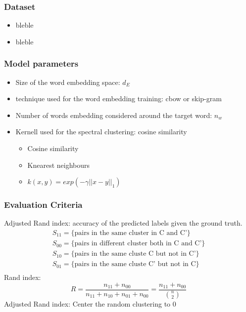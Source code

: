 \documentclass{beamer}
\begin{document}
 

\begin{frame}
\frametitle{Dataset}
\begin{itemize} 
\item bleble
\item bleble
\end{itemize}
\end{frame}

\begin{frame}
\frametitle{Model parameters}
\begin{itemize} 
\item Size of the word  embedding space: $d_E$
\item technique used for the word embedding training: cbow  or skip-gram
\item Number of words embedding considered around the target word: $n_w$
\item Kernell used for the spectral clustering: cosine similarity 
\begin{itemize}
\item Cosine similarity 
\item Knearest neighbours 
\item $k(x,y)=exp(-\gamma ||x-y||_1)$
\end{itemize} 
\end{itemize}  
\end{frame}

\begin{frame}
\frametitle{Evaluation Criteria}
Adjusted Rand index: accuracy of the predicted labels given the ground truth.
$$
\begin{array}{ll}
S_{11} = \{\text{pairs in the same cluster in C and C'} \}\\
S_{00} =  \{\text{pairs in different cluster both in C and C'} \}\\
S_{10} =  \{\text{pairs in the same cluste C but not in C'} \}\\
S_{01} =  \{\text{pairs in the same cluste C' but not in C}  \}\\
\end{array}
$$
Rand index:
$$
R=\frac{n_{11}+n_{00}}{n_{11}+n_{10}+n_{01}+n_{00}} = \frac{n_{11}+n_{00}}{{ n\choose 2}}
$$
Adjusted Rand index: Center the random clustering to 0
\end{frame}
\end{document}
